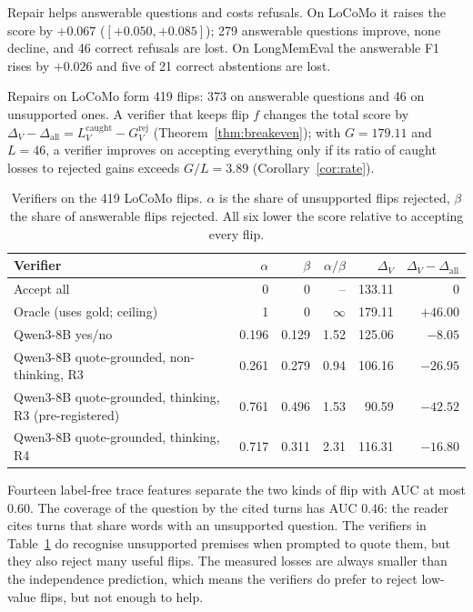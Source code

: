 \documentclass[10pt]{article}
\theoremstyle{plain}
\begin{document}
Repair helps answerable questions and costs refusals. On LoCoMo it raises the score by $+0.067$
($[+0.050,+0.085]$); 279 answerable questions improve, none decline, and 46 correct refusals are lost. On
LongMemEval the answerable F1 rises by $+0.026$ and five of 21 correct abstentions are lost.

Repairs on LoCoMo form 419 flips: 373 on answerable questions and 46 on unsupported ones. A verifier that
keeps flip $f$ changes the total score by $\Delta_V-\Delta_{\mathrm{all}}=L^{\mathrm{caught}}_V-G^{\mathrm{rej}}_V$
(Theorem~\ref{thm:breakeven}); with $G=179.11$ and $L=46$, a verifier improves on accepting everything only
if its ratio of caught losses to rejected gains exceeds $G/L=3.89$ (Corollary~\ref{cor:rate}).

\begin{table}[t]
\centering
\caption{Verifiers on the 419 LoCoMo flips. $\alpha$ is the share of unsupported flips rejected, $\beta$ the
share of answerable flips rejected. All six lower the score relative to accepting every flip.}
\label{tab:verify}
\small
\begin{tabular}{lrrrrr}
\toprule
Verifier & $\alpha$ & $\beta$ & $\alpha/\beta$ & $\Delta_V$ & $\Delta_V-\Delta_{\mathrm{all}}$ \\
\midrule
Accept all & 0 & 0 & -- & 133.11 & 0 \\
Oracle (uses gold; ceiling) & 1 & 0 & $\infty$ & 179.11 & $+46.00$ \\
Qwen3-8B yes/no & 0.196 & 0.129 & 1.52 & 125.06 & $-8.05$ \\
Qwen3-8B quote-grounded, non-thinking, R3 & 0.261 & 0.279 & 0.94 & 106.16 & $-26.95$ \\
Qwen3-8B quote-grounded, thinking, R3 (pre-registered) & 0.761 & 0.496 & 1.53 & 90.59 & $-42.52$ \\
Qwen3-8B quote-grounded, thinking, R4 & 0.717 & 0.311 & 2.31 & 116.31 & $-16.80$ \\
\bottomrule
\end{tabular}
\end{table}

Fourteen label-free trace features separate the two kinds of flip with AUC at most 0.60. The coverage of the
question by the cited turns has AUC 0.46: the reader cites turns that share words with an unsupported question.
The verifiers in Table~\ref{tab:verify} do recognise unsupported premises when prompted to quote them, but they
also reject many useful flips. The measured losses are always smaller than the independence prediction, which
means the verifiers do prefer to reject low-value flips, but not enough to help.
\end{document}
